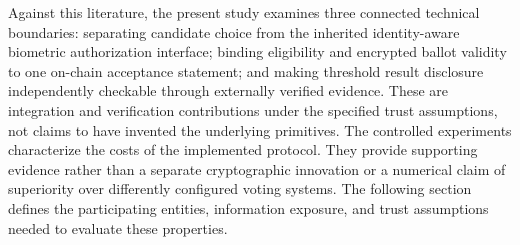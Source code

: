 Against this literature, the present study examines three connected technical boundaries: separating candidate choice from the inherited identity-aware biometric authorization interface; binding eligibility and encrypted ballot validity to one on-chain acceptance statement; and making threshold result disclosure independently checkable through externally verified evidence. These are integration and verification contributions under the specified trust assumptions, not claims to have invented the underlying primitives. The controlled experiments characterize the costs of the implemented protocol. They provide supporting evidence rather than a separate cryptographic innovation or a numerical claim of superiority over differently configured voting systems. The following section defines the participating entities, information exposure, and trust assumptions needed to evaluate these properties.
